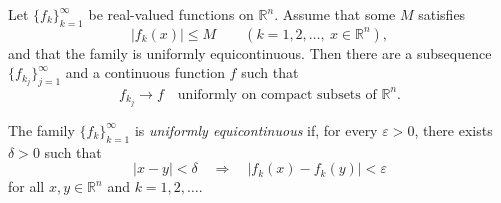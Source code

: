 \begin{theorem}
\label{thm:arzela-ascoli-theorem}

Let $\{f_k\}_{k=1}^\infty$ be real-valued functions on $\mathbb R^n$. Assume that some $M$ satisfies
\[
|f_k(x)|\leq M
\qquad(k=1,2,\ldots,\ x\in\mathbb R^n),
\]
and that the family is uniformly equicontinuous. Then there are a subsequence $\{f_{k_j}\}_{j=1}^\infty$ and a continuous function $f$ such that
\[
f_{k_j}\to f
\quad\text{uniformly on compact subsets of }\mathbb R^n.
\]
\end{theorem}

\begin{definition}
\label{def:uniform-equicontinuity}
The family $\{f_k\}_{k=1}^\infty$ is \textit{uniformly equicontinuous} if, for every $\varepsilon>0$, there exists $\delta>0$ such that
\[
|x-y|<\delta
\quad\Longrightarrow\quad
|f_k(x)-f_k(y)|<\varepsilon
\]
for all $x,y\in\mathbb R^n$ and $k=1,2,\ldots$.
\end{definition}
